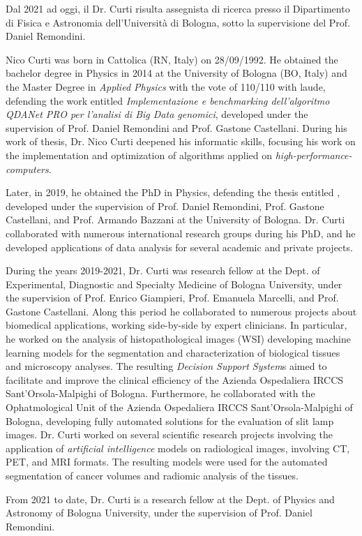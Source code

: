 {  Dal 2021 ad oggi, il Dr. Curti risulta assegnista di ricerca presso il Dipartimento di Fisica e Astronomia dell'Università di Bologna, sotto la supervisione del Prof. Daniel Remondini.

} {

  Nico Curti was born in Cattolica (RN, Italy) on 28/09/1992.
  He obtained the bachelor degree in Physics in 2014 at the University of Bologna (BO, Italy) and the Master Degree in \emph{Applied Physics} with the vote of 110/110 with laude, defending the work entitled \emph{Implementazione e benchmarking dell'algoritmo QDANet PRO per l'analisi di Big Data genomici}, developed under the supervision of Prof. Daniel Remondini and Prof. Gastone Castellani.
  During his work of thesis, Dr. Nico Curti deepened his informatic skills, focusing his work on the implementation and optimization of algorithms applied on \emph{high-performance-computers}.

  Later, in 2019, he obtained the PhD in Physics, defending the thesis entitled , developed under the supervision of Prof. Daniel Remondini, Prof. Gastone Castellani, and Prof. Armando Bazzani at the University of Bologna.
  Dr. Curti collaborated with numerous international research groups during his PhD, and he developed applications of data analysis for several academic and private projects.

  During the years 2019-2021, Dr. Curti was research fellow at the Dept. of Experimental, Diagnostic and Specialty Medicine of Bologna University, under the supervision of Prof. Enrico Giampieri, Prof. Emanuela Marcelli, and Prof. Gastone Castellani.
  Along this period he collaborated to numerous projects about biomedical applications, working side-by-side by expert clinicians.
  In particular, he worked on the analysis of histopathological images (WSI) developing machine learning models for the segmentation and characterization of biological tissues and microscopy analyses.
  The resulting \emph{Decision Support System}s aimed to facilitate and improve the clinical efficiency of the Azienda Ospedaliera IRCCS Sant'Orsola-Malpighi of Bologna.
  Furthermore, he collaborated with the Ophatmological Unit of the Azienda Ospedaliera IRCCS Sant'Orsola-Malpighi of Bologna, developing fully automated solutions for the evaluation of slit lamp images.
  Dr. Curti worked on several scientific research projects involving the application of \emph{artificial intelligence} models on radiological images, involving CT, PET, and MRI formats.
  The resulting models were used for the automated segmentation of cancer volumes and radiomic analysis of the tissues.

  From 2021 to date, Dr. Curti is a research fellow at the Dept. of Physics and Astronomy of Bologna University, under the supervision of Prof. Daniel Remondini.
}
